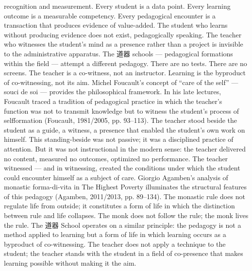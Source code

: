 recognition and measurement. Every student is a data point. Every learning outcome is a measurable competency. Every pedagogical encounter is a transaction that produces evidence of value-added. The student who learns without producing evidence does not exist, pedagogically speaking. The teacher who witnesses the student’s mind as a presence rather than a project is invisible to the administrative apparatus. The 道器 schools — pedagogical formations within the field — attempt a different pedagogy. There are no tests. There are no screens. The teacher is a co-witness, not an instructor. Learning is the byproduct of co-witnessing, not its aim. Michel Foucault’s concept of “care of the self” — souci de soi — provides the philosophical framework. In his late lectures, Foucault traced a tradition of pedagogical practice in which the teacher’s function was not to transmit knowledge but to witness the student’s process of selfformation (Foucault, 1981/2005, pp. 93–113). The teacher stood beside the student as a guide, a witness, a presence that enabled the student’s own work on himself. This standing-beside was not passive; it was a disciplined practice of attention. But it was not instructional in the modern sense: the teacher delivered no content, measured no outcomes, optimized no performance. The teacher witnessed — and in witnessing, created the conditions under which the student could encounter himself as a subject of care. Giorgio Agamben’s analysis of monastic forma-di-vita in The Highest Poverty illuminates the structural features of this pedagogy (Agamben, 2011/2013, pp. 89–134). The monastic rule does not regulate life from outside; it constitutes a form of life in which the distinction between rule and life collapses. The monk does not follow the rule; the monk lives the rule. The 道器 School operates on a similar principle: the pedagogy is not a method applied to learning but a form of life in which learning occurs as a byproduct of co-witnessing. The teacher does not apply a technique to the student; the teacher stands with the student in a field of co-presence that makes learning possible without making it the aim.

